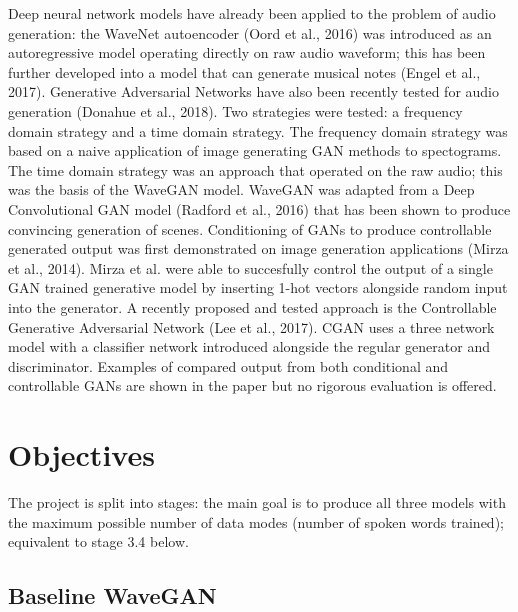 \documentclass[titlepage]{article}
\begin{document}
Deep neural network models have already been applied to the problem of audio generation: the WaveNet autoencoder (Oord et al., 2016) was introduced as an autoregressive model operating directly on raw audio waveform; this has been further developed into a model that can generate musical notes (Engel et al., 2017).
\newline
\newline
Generative Adversarial Networks have also been recently tested for audio generation (Donahue et al., 2018).
Two strategies were tested: a frequency domain strategy and a time domain strategy.
The frequency domain strategy was based on a naive application of image generating GAN methods to spectograms.
The time domain strategy was an approach that operated on the raw audio; this was the basis of the WaveGAN model.
WaveGAN was adapted from a Deep Convolutional GAN model (Radford et al., 2016) that has been shown to produce convincing generation of scenes.
\newline
\newline
Conditioning of GANs to produce controllable generated output was first demonstrated on image generation applications (Mirza et al., 2014).
Mirza et al. were able to succesfully control the output of a single GAN trained generative model by inserting 1-hot vectors alongside random input into the generator.
\newline
\newline
A recently proposed and tested approach is the Controllable Generative Adversarial Network (Lee et al., 2017).
CGAN uses a three network model with a classifier network introduced alongside the regular generator and discriminator.
Examples of compared output from both conditional and controllable GANs are shown in the paper but no rigorous evaluation is offered.

\section{Objectives}

The project is split into stages: the main goal is to produce all three models with the maximum possible number of data modes (number of spoken words trained); equivalent to stage 3.4 below.

\subsection{Baseline WaveGAN}
\end{document}
